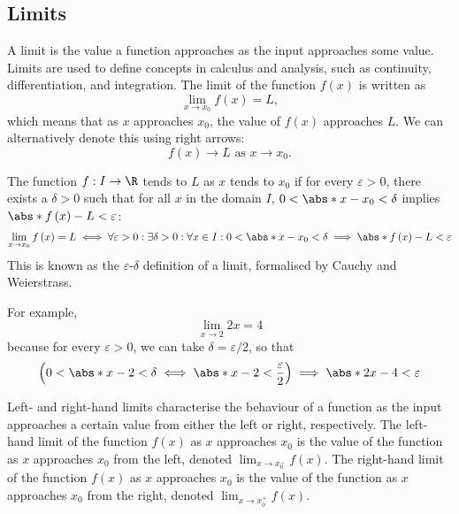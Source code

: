 \documentclass{article}
\begin{document}
\subsection{Limits}
\begin{definition}
    A limit is the value a function approaches as the input approaches
    some value. Limits are used to define concepts in calculus and
    analysis, such as continuity, differentiation, and integration.
    The limit of the function \(f\left( x \right)\) is written as
    \begin{equation*}
        \lim_{x\to x_0} f\left( x \right) = L,
    \end{equation*}
    which means that as \(x\) approaches \(x_0\), the value of
    \(f\left( x \right)\) approaches \(L\). We can alternatively denote
    this using right arrows:
    \begin{equation*}
        f\left( x \right) \to L \text{ as } x \to x_0.
    \end{equation*}
\end{definition}
\begin{definition}
    The function \(f: I \to \R\) tends to \(L\) as \(x\) tends to
    \(x_0\) if for every \(\varepsilon > 0\), there exists a
    \(\delta > 0\) such that for all \(x\) in the domain \(I\),
    \(0 < \abs*{x - x_0} < \delta\) implies
    \(\abs*{f\left( x \right) - L} < \varepsilon\):
    \begin{equation*}
        \lim_{x\to x_0} f\left( x \right) = L \iff \forall\varepsilon>0: \exists\delta>0: \forall x \in I: 0<\abs*{x-x_0}<\delta \implies \abs*{f\left( x \right)-L}<\varepsilon
    \end{equation*}
    This is known as the \(\varepsilon\)-\(\delta\) definition of a
    limit, formalised by Cauchy and Weierstrass.
\end{definition}
For example,
\begin{equation*}
    \lim_{x \to 2} 2 x = 4
\end{equation*}
because for every \(\varepsilon > 0\), we can take \(\delta = \varepsilon/2\), so that
\begin{equation*}
    \left( 0 < \abs*{x - 2} < \delta \iff \abs*{x - 2} < \frac{\varepsilon}{2} \right) \implies \abs*{2x - 4} < \varepsilon
\end{equation*}
\begin{definition}
    Left- and right-hand limits characterise the behaviour of a function
    as the input approaches a certain value from either the left or
    right, respectively.
    The left-hand limit of the function \(f\left( x \right)\) as \(x\)
    approaches \(x_0\) is the value of the function as \(x\) approaches
    \(x_0\) from the left, denoted \(\lim_{x\to x_0^-} f\left( x
    \right)\). The right-hand limit of the function \(f\left( x
    \right)\) as \(x\) approaches \(x_0\) is the value of the function
    as \(x\) approaches \(x_0\) from the right, denoted \(\lim_{x\to
    x_0^+} f\left( x \right)\).
\end{definition}
\end{document}
